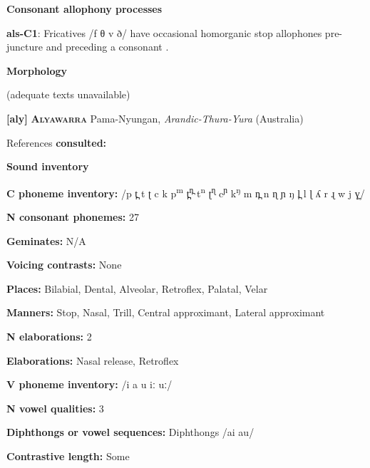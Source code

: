 \textbf{Consonant allophony processes}



\textbf{als-C1}: Fricatives /f θ v ð/ have occasional homorganic stop allophones pre-juncture and preceding a consonant \citep{Newmark1957}.



\textbf{Morphology}



(adequate texts unavailable)



\textbf{[aly]}   \textbf{\textsc{Alyawarra}}  Pama-Nyungan, \textit{Arandic-Thura-Yura} (Australia)



References \textbf{consulted:} \citet{Yallop1977}



\textbf{Sound inventory}



\textbf{C phoneme inventory:} /p t̪ t ʈ c k p\textsuperscript{m} t̪\textsuperscript{n̪} t\textsuperscript{n} ʈ\textsuperscript{ɳ} c\textsuperscript{ɲ} k\textsuperscript{ŋ} m n̪ n ɳ ɲ ŋ l̪ l ɭ ʎ r ɻ w j ɣ̞/



\textbf{N consonant phonemes:} 27



\textbf{Geminates:} N/A



\textbf{Voicing contrasts:} None



\textbf{Places:} Bilabial, Dental, Alveolar, Retroflex, Palatal, Velar



\textbf{Manners:} Stop, Nasal, Trill, Central approximant, Lateral approximant



\textbf{N elaborations:} 2



\textbf{Elaborations:} Nasal release, Retroflex



\textbf{V phoneme inventory:} /i a u iː uː/



\textbf{N vowel qualities:} 3



\textbf{Diphthongs or vowel sequences:} Diphthongs /ai au/



\textbf{Contrastive length:} Some



